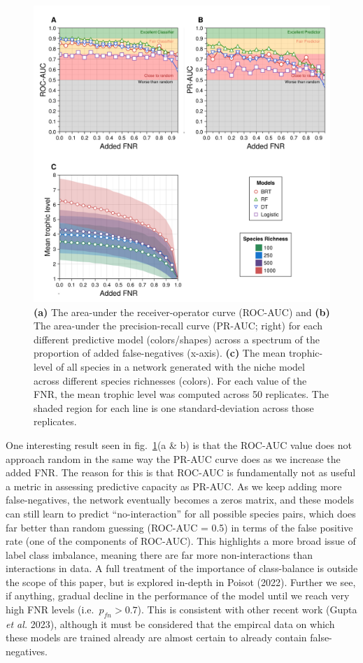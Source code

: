 \documentclass[10pt,oneside]{article}
\makeatletter
\def\maxwidth{\ifdim\Gin@nat@width>\linewidth\linewidth
\else\Gin@nat@width\fi}
\let\Oldincludegraphics\includegraphics
\renewcommand{\includegraphics}[1]{\Oldincludegraphics[width=\maxwidth]{#1}}
\makeatother
\begin{document}
\begin{figure}
\hypertarget{fig:addedfnr}{%
\centering
\includegraphics{./figures/fig3.png}
\caption{\textbf{(a)} The area-under the receiver-operator curve
(ROC-AUC) and \textbf{(b)} The area-under the precision-recall curve
(PR-AUC; right) for each different predictive model (colors/shapes)
across a spectrum of the proportion of added false-negatives (x-axis).
\textbf{(c)} The mean trophic-level of all species in a network
generated with the niche model across different species richnesses
(colors). For each value of the FNR, the mean trophic level was computed
across 50 replicates. The shaded region for each line is one
standard-deviation across those replicates.}\label{fig:addedfnr}
}
\end{figure}

One interesting result seen in fig.~\ref{fig:addedfnr}(a \& b) is that
the ROC-AUC value does not approach random in the same way the PR-AUC
curve does as we increase the added FNR. The reason for this is that
ROC-AUC is fundamentally not as useful a metric in assessing predictive
capacity as PR-AUC. As we keep adding more false-negatives, the network
eventually becomes a zeros matrix, and these models can still learn to
predict ``no-interaction'' for all possible species pairs, which does
far better than random guessing (ROC-AUC = 0.5) in terms of the false
positive rate (one of the components of ROC-AUC). This highlights a more
broad issue of label class imbalance, meaning there are far more
non-interactions than interactions in data. A full treatment of the
importance of class-balance is outside the scope of this paper, but is
explored in-depth in Poisot (2022). Further we see, if anything, gradual
decline in the performance of the model until we reach very high FNR
levels (i.e.~\(p_{fn} > 0.7\)). This is consistent with other recent
work (Gupta \emph{et al.} 2023), although it must be considered that the
empircal data on which these models are trained already are almost
certain to already contain false-negatives.
\end{document}
